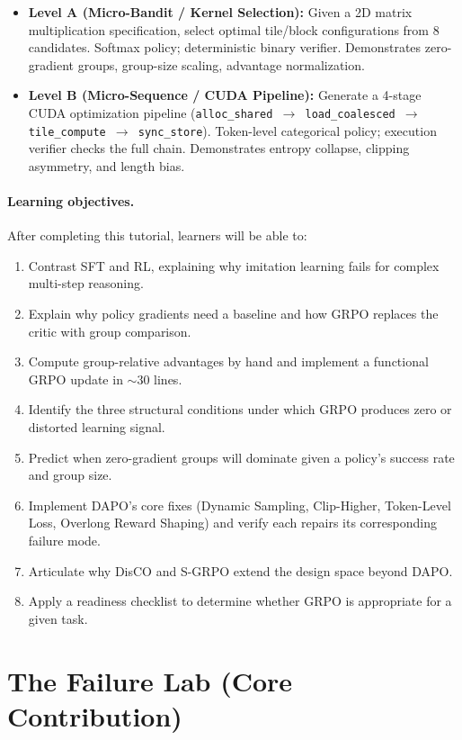 \documentclass{article}
\begin{document}
\begin{itemize}[nosep,leftmargin=1.5em]
  \item \textbf{Level A (Micro-Bandit / Kernel Selection):} Given a 2D matrix multiplication specification, select optimal tile/block configurations from 8 candidates. Softmax policy; deterministic binary verifier. Demonstrates zero-gradient groups, group-size scaling, advantage normalization.
  \item \textbf{Level B (Micro-Sequence / CUDA Pipeline):} Generate a 4-stage CUDA optimization pipeline (\texttt{alloc\_shared $\to$ load\_coalesced $\to$ tile\_compute $\to$ sync\_store}). Token-level categorical policy; execution verifier checks the full chain. Demonstrates entropy collapse, clipping asymmetry, and length bias.
\end{itemize}

\paragraph{Learning objectives.} After completing this tutorial, learners will be able to:
\begin{enumerate}[nosep,leftmargin=1.5em]
  \item Contrast SFT and RL, explaining why imitation learning fails for complex multi-step reasoning.
  \item Explain why policy gradients need a baseline and how GRPO replaces the critic with group comparison.
  \item Compute group-relative advantages by hand and implement a functional GRPO update in $\sim$30 lines.
  \item Identify the three structural conditions under which GRPO produces zero or distorted learning signal.
  \item Predict when zero-gradient groups will dominate given a policy's success rate and group size.
  \item Implement DAPO's core fixes (Dynamic Sampling, Clip-Higher, Token-Level Loss, Overlong Reward Shaping) and verify each repairs its corresponding failure mode.
  \item Articulate why DisCO and S-GRPO extend the design space beyond DAPO.
  \item Apply a readiness checklist to determine whether GRPO is appropriate for a given task.
\end{enumerate}

\section{The Failure Lab (Core Contribution)}
\end{document}
